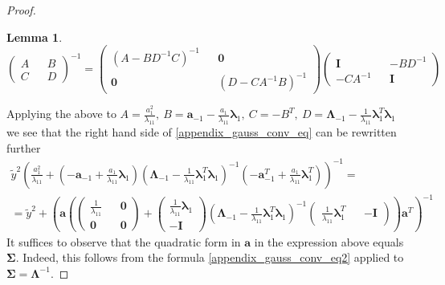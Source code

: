 \documentclass[10pt,fleqn]{amsart}
\newtheorem{lemma}[theorem]{Lemma}
\theoremstyle{definition}
\theoremstyle{remark}
\numberwithin{equation}{section}
\newcommand{\aaa}{\boldsymbol{a}}
\newcommand{\SSigma}{\boldsymbol{\Sigma}}
\newcommand{\llambda}{\boldsymbol{\lambda}}
\newcommand{\LLambda}{\boldsymbol{\Lambda}}
\newcommand{\ytilde}{\widetilde{y}}
\begin{document}
\begin{proof}
\begin{lemma}
\begin{equation}
        \left(\begin{matrix}A&&B\\C&&D\end{matrix}\right)^{-1}=
        \left(\begin{matrix}\left(A-BD^{-1}C\right)^{-1}&&\boldsymbol{0}\\\boldsymbol{0}&&\left(D-CA^{-1}B\right)^{-1}\end{matrix}\right)
        \left(\begin{matrix}\boldsymbol{I}&&-BD^{-1}\\-CA^{-1}&&\boldsymbol{I}\end{matrix}\right)
    \end{equation}
\end{lemma}
Applying the above to
$A=\frac{a_1^2}{\lambda_{11}},\ B=\aaa_{-1}-\frac{a_1}{\lambda_{11}}\llambda_1,\ C=-B^T,\ D=\LLambda_{-1}-\frac 1{\lambda_{11}}\llambda_1^T\llambda_1$
we see that the right hand side of \ref{appendix_gauss_conv_eq} can be rewritten further
\begin{equation}\begin{split}
    \ytilde^2\left(
        \frac{a_1^2}{\lambda_{11}}+
        \left(-\aaa_{-1}+\frac{a_1}{\lambda_{11}}\llambda_1\right)
        \left(\LLambda_{-1}-\frac 1{\lambda_{11}}\llambda_1^T\llambda_1\right)^{-1}
        \left(-\aaa_{-1}^T+\frac{a_1}{\lambda_{11}}\llambda_1^T\right)
        \right)^{-1}=\\
        =\ytilde^2+\left(\aaa\left(
            \left(\begin{matrix}\frac 1{\lambda_{11}}&&\boldsymbol{0}\\\boldsymbol{0}&&\boldsymbol{0}\end{matrix}\right)+
            \left(\begin{matrix}\frac 1{\lambda_{11}}\llambda_1\\-\boldsymbol{I}\end{matrix}\right)
            \left(\LLambda_{-1}-\frac 1{\lambda_{11}}\llambda_1^T\llambda_1\right)^{-1}
            \left(\begin{matrix}\frac 1{\lambda_{11}}\llambda_1^T&&-\boldsymbol{I}\end{matrix}\right)
            \right)\aaa^T\right)^{-1}
\end{split}\end{equation}
It suffices to observe that the quadratic form in $\aaa$ in the expression above equals $\SSigma$. Indeed, this follows from
the formula \ref{appendix_gauss_conv_eq2} applied to $\SSigma=\LLambda^{-1}$.
\end{proof}
\end{document}
